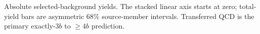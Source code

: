 Absolute selected-background yields. The stacked linear axis starts at zero; total-yield bars are asymmetric 68\% source-member intervals. Transferred QCD is the primary exactly-$3b$ to $\geq4b$ prediction.
